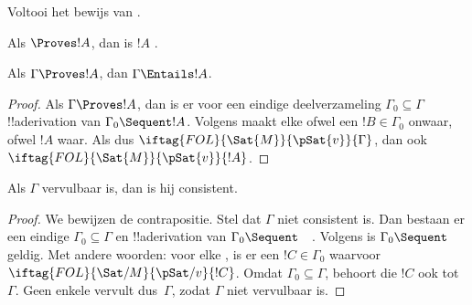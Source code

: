 \documentclass[../../../include/open-logic-section]{subfiles}
\begin{document}
\begin{prob}
Voltooi het bewijs van .
\end{prob}
\tagendprob

\begin{cor}
Als $\Proves !A$, dan is $!A$ .
\end{cor}

\begin{cor}
Als $\Gamma \Proves !A$, dan $\Gamma \Entails !A$.
\end{cor}

\begin{proof}
Als $\Gamma \Proves !A$, dan is er voor een eindige deelverzameling
$\Gamma_0 \subseteq \Gamma$ !!a{derivation} van $\Gamma_0 \Sequent
!A$. Volgens  maakt elke
ofwel een $!B \in \Gamma_0$ onwaar, ofwel $!A$ waar. Als dus
$\iftag{FOL}{\Sat{M}}{\pSat{v}}{\Gamma}$, dan ook
$\iftag{FOL}{\Sat{M}}{\pSat{v}}{!A}$.
\end{proof}

\begin{cor}
Als $\Gamma$ vervulbaar is, dan is hij consistent.
\end{cor}

\begin{proof}
We bewijzen de contrapositie. Stel dat $\Gamma$ niet consistent is.
Dan bestaan er een eindige $\Gamma_0 \subseteq \Gamma$ en
!!a{derivation} van $\Gamma_0 \Sequent \quad$. Volgens
 is $\Gamma_0 \Sequent \quad$ geldig.
Met andere woorden: voor elke
,
is er een $!C \in \Gamma_0$ waarvoor
$\iftag{FOL}{\Sat/{M}}{\pSat/{v}}{!C}$. Omdat $\Gamma_0 \subseteq
\Gamma$, behoort die $!C$ ook tot~$\Gamma$. Geen enkele
 vervult dus~$\Gamma$, zodat
$\Gamma$ niet vervulbaar is.
\end{proof}
\end{document}
